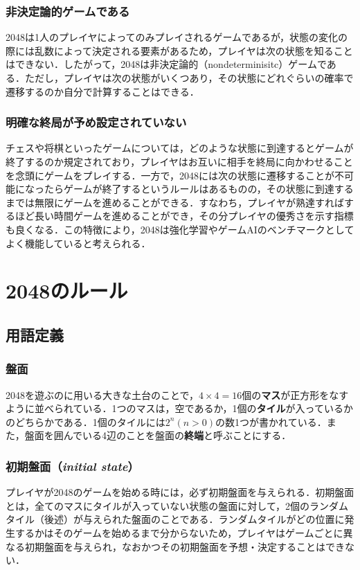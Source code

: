 \documentclass{suribt}
\begin{document}
\subsubsection{非決定論的ゲームである}
2048は1人のプレイヤによってのみプレイされるゲームであるが，状態の変化の際には乱数によって決定される要素があるため，プレイヤは次の状態を知ることはできない．したがって，2048は非決定論的（nondeterminisitc）ゲームである．ただし，プレイヤは次の状態がいくつあり，その状態にどれぐらいの確率で遷移するのか自分で計算することはできる．

\subsubsection{明確な終局が予め設定されていない}
チェスや将棋といったゲームについては，どのような状態に到達するとゲームが終了するのか規定されており，プレイヤはお互いに相手を終局に向かわせることを念頭にゲームをプレイする．一方で，2048には次の状態に遷移することが不可能になったらゲームが終了するというルールはあるものの，その状態に到達するまでは無限にゲームを進めることができる．すなわち，プレイヤが熟達すればするほど長い時間ゲームを進めることができ，その分プレイヤの優秀さを示す指標も良くなる．この特徴により，2048は強化学習やゲームAIのベンチマークとしてよく機能していると考えられる．

\section{2048のルール}
\subsection{用語定義}
\subsubsection{盤面}
2048を遊ぶのに用いる大きな土台のことで，$4 \times 4 = 16$個の\textbf{マス}が正方形をなすように並べられている．1つのマスは，空であるか，1個の\textbf{タイル}が入っているかのどちらかである．1個のタイルには$2^n (n>0)$の数1つが書かれている．また，盤面を囲んでいる4辺のことを盤面の\textbf{終端}と呼ぶことにする．

\subsubsection{初期盤面（\textit{initial state}）}
プレイヤが2048のゲームを始める時には，必ず初期盤面を与えられる．初期盤面とは，全てのマスにタイルが入っていない状態の盤面に対して，2個のランダムタイル（後述）が与えられた盤面のことである．ランダムタイルがどの位置に発生するかはそのゲームを始めるまで分からないため，プレイヤはゲームごとに異なる初期盤面を与えられ，なおかつその初期盤面を予想・決定することはできない．
\end{document}
